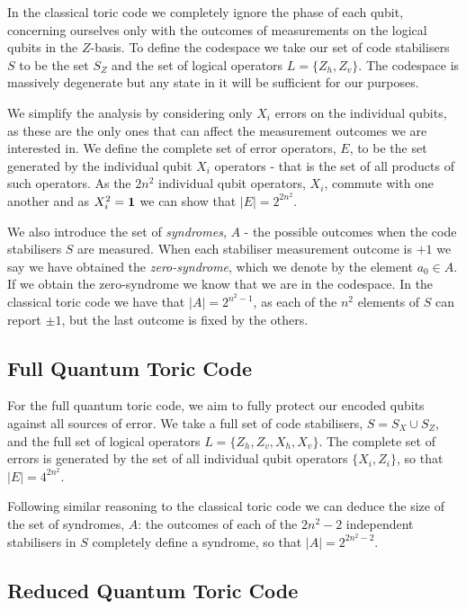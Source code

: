 In the classical toric code we completely ignore the phase of each qubit, concerning ourselves only with the outcomes of measurements on the logical qubits in the $Z$-basis. To define the codespace we take our set of code stabilisers $S$ to be the set $S_Z$ and the set of logical operators $L=\{Z_h, Z_v\}$. The codespace is massively degenerate but any state in it will be sufficient for our purposes.

We simplify the analysis by considering only $X_i$ errors on the individual qubits, as these are the only ones that can affect the measurement outcomes we are interested in. We define the complete set of error operators, $E$, to be the set generated by the individual qubit $X_i$ operators - that is the set of all products of such operators. As the $2n^2$ individual qubit operators, $X_i$, commute with one another and as $X_i^2 = \mathbf{1}$ we can show that $|E| = 2^{2n^2}$.

We also introduce the set of \textit{syndromes}, $A$ - the possible outcomes when the code stabilisers $S$ are measured. When each stabiliser measurement outcome is $+1$ we say we have obtained the \textit{zero-syndrome}, which we denote by the element $a_0 \in A$. If we obtain the zero-syndrome we know that we are in the codespace. In the classical toric code we have that $|A| = 2^{n^2-1}$, as each of the $n^2$ elements of $S$ can report $\pm 1$, but the last outcome is fixed by the others.

\subsection{Full Quantum Toric Code}

For the full quantum toric code, we aim to fully protect our encoded qubits against all sources of error. We take a full set of code stabilisers, $S = S_X \cup S_Z$, and the full set of logical operators $L = \{Z_h, Z_v, X_h, X_v\}$. The complete set of errors is generated by the set of all individual qubit operators $\{X_i, Z_i\}$, so that $|E| = 4^{2n^2}$.

Following similar reasoning to the classical toric code we can deduce the size of the set of syndromes, $A$: the outcomes of each of the $2n^2 - 2$ independent stabilisers in $S$ completely define a syndrome, so that $|A| = 2^{2n^2-2}$.

\subsection{Reduced Quantum Toric Code}


